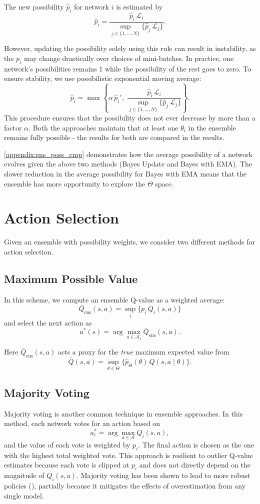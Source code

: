\documentclass[11pt,a4paper]{report}
\begin{document}
The new possibility \(\hat{p}_i\) for network \(i\) is estimated by
\[
  \hat{p}_i = \frac{\hat{p}_i \, \mathcal{L}_i}{\sup_{j \in \{1, \dots, N\}} \{\hat{p}_j \, \mathcal{L}_j\}}.
\]

However, updating the possibility solely using this rule can result in instability, as the \(p_i\) may change drastically over choices of mini-batches. In practice, one network's possibilities remains $1$ while the possibility of the rest goes to zero. To ensure stability, we use possibilistic exponential moving average:
\[
  \hat{p}_i = \max \left\{ \alpha\, \hat{p}_i', \; \frac{\hat{p}_i \, \mathcal{L}_i}{\sup_{j \in \{1, \dots, N\}} \{\hat{p}_j \, \mathcal{L}_j\}} \right\}.
\]
This procedure ensures that the possibility does not ever decrease by more than a factor $\alpha$. Both the approaches maintain that at least one $\theta_i$ in the ensemble remains fully possible - the results for both are compared in the results.   

\ref{appendix:ens_poss_cmp} demonstrates how the average possibility of a network evolves given the above two methods (Bayes Update and Bayes with EMA). The slower reduction in the average possibility for Bayes with EMA means that the ensemble has more opportunity to explore the $\Theta$ space.  

\section{Action Selection}
Given an ensemble with possibility weights, we consider two different methods for action selection.

\subsection{Maximum Possible Value}
In this scheme, we compute an ensemble Q-value as a weighted average:
\[
  \bar{Q}_{\text{ens}}(s,a) = \sup_{i} \{p_i\, Q_i(s,a)\}
\]
and select the next action as
\[ a^*(s) = \arg \max_{a \in \mathcal{A}_s} \bar{Q}_{\text{ens}}(s,a). \]

Here $\bar{Q}_{\text{ens}}(s,a)$ acts a proxy for the \emph{true} maximum expected value from 
\[ \bar{Q}(s,a) =\sup_{\theta\in\Theta}\bigl\{\hat{p}_\Theta(\theta)\,Q(s,a\mid\theta)\bigr\}. \]

\subsection{Majority Voting}
Majority voting is another common technique in ensemble approaches. In this method, each network votes for an action based on
\[
  a_i^* = \arg \max_{a \in \mathcal{A}} Q_i(s,a),
\]
and the value of each vote is weighted by \(p_i\). The final action is chosen as the one with the highest total weighted vote. This approach is resilient to outlier Q-value estimates because each vote is clipped at \(p_i\) and does not directly depend on the magnitude of \(Q_i(s,a)\). Majority voting has been shown to lead to more robust policies (\cite{Hans2010}), partially because it mitigates the effects of overestimation from any single model.
\end{document}

